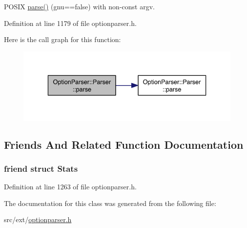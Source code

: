 P\-O\-S\-I\-X \hyperlink{class_option_parser_1_1_parser_adbde29c0025d0ec88f8b41a656ab45a1}{parse()} (gnu==false) with non-\/const argv. 



Definition at line 1179 of file optionparser.\-h.



Here is the call graph for this function\-:\nopagebreak
\begin{figure}[H]
\begin{center}
\leavevmode
\includegraphics[width=336pt]{class_option_parser_1_1_parser_a3a5ed99c44d5d02191bb48465036870b_cgraph}
\end{center}
\end{figure}




\subsection{Friends And Related Function Documentation}
\hypertarget{class_option_parser_1_1_parser_a7183dc3501d1c87153f9c0d41f869460}{
\subsubsection[{Stats}]{\setlength{\rightskip}{0pt plus 5cm}friend struct {\bf Stats}\hspace{0.3cm}{\ttfamily [friend]}}}\label{class_option_parser_1_1_parser_a7183dc3501d1c87153f9c0d41f869460}


Definition at line 1263 of file optionparser.\-h.



The documentation for this class was generated from the following file\-:\begin{DoxyCompactItemize}
\item 
src/ext/\hyperlink{optionparser_8h}{optionparser.\-h}\end{DoxyCompactItemize}
